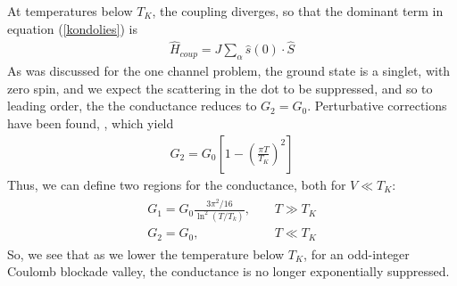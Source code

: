 \documentclass[twocolumn]{el-author}
\newcommand{\hH}{\hat{H}}
\begin{document}
At temperatures below $T_{K}$, the coupling diverges, so that the dominant term in equation (\ref{kondolies}) is
\begin{align}
  \hH_{coup}=J\sum_{\alpha}\hat{s}(0)\cdot\hat{S}
\end{align}
As was discussed for the one channel problem, the ground state is a singlet, with zero spin, and we expect the scattering in the dot to be suppressed, and so to leading order, the the conductance reduces to $G_{2}=G_{0}$.  Perturbative corrections have been found, \cite{3}, which yield
\begin{align}
  G_{2}=G_{0}\left[1-\left(\frac{\pi T}{T_{K}}\right)^{2}\right]
\end{align}
Thus, we can define two regions for the conductance, both for $V\ll T_{K}$:
\begin{align}
  \begin{array}{cc}
    G_{1}=G_{0}\frac{3\pi^{2}/16}{\ln^{2}(T/T_{k})}, & \;\;\;\;T\gg T_{K} \\
    G_{2}=G_{0}, & \;\;\;\;T\ll T_{K}
  \end{array}
\end{align}
So, we see that as we lower the temperature below $T_{K}$, for an odd-integer Coulomb blockade valley, the conductance is no longer exponentially suppressed.
\end{document}
